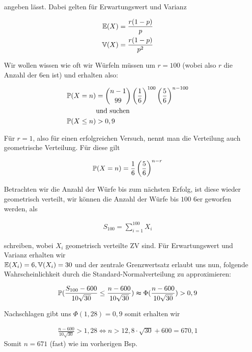 \begin{solution}
angeben lässt. Dabei gelten für Erwartungswert und Varianz

\begin{align}
  \E(X) &= \frac{r(1-p)}{p} \nonumber \\
  \V(X) &= \frac{r(1-p)}{p^2} 
\end{align}

Wir wollen wissen wie oft wir Würfeln müssen um $r=100$ (wobei also $r$ die
Anzahl der $6$en ist) und erhalten also:

\begin{align*}
  \P(X=n) &= \binom{n-1}{99}\pbraces{\frac{1}{6}}^{100}\pbraces{\frac{5}{6}}^{n-100} \\
  &\text{und suchen} \\
  \P(X \leq n) &> 0,9
\end{align*}

Für $r=1$, also für einen erfolgreichen Versuch, nennt man die Verteilung auch
geometrische Verteilung. Für diese gilt

\begin{align*}
  \P(X=n)=\frac{1}{6}\pbraces{\frac{5}{6}}^{n-r}
\end{align*}

Betrachten wir die Anzahl der Würfe bis zum nächsten Erfolg, ist diese wieder
geometrisch verteilt, wir können die Anzahl der Würfe bis $100$ $6$er geworfen
werden, als

\begin{align*}
  S_{100} = \sum_{i=1}^{100}X_i
\end{align*}

schreiben, wobei $X_i$ geometrisch verteilte ZV sind. Für Erwartungswert und
Varianz erhalten wir \\
$\E(X_i)=6, \V(X_i)=30$ und der zentrale Grenzwertsatz erlaubt uns nun, folgende
Wahrscheinlichkeit durch die Standard-Normalverteilung zu approximieren:

\begin{align*}
  \P(\frac{S_{100}-600}{10\sqrt{30}} \leq \frac{n-600}{10\sqrt{30}}) \thickapprox
  \Phi(\frac{n-600}{10\sqrt{30}}) > 0,9
\end{align*}

Nachschlagen gibt uns $\Phi(1,28)=0,9$ somit erhalten wir

\begin{align*}
  \frac{n-600}{10\sqrt{30}} > 1,28 \Leftrightarrow
  n > 12,8 \cdot \sqrt{30} + 600 = 670,1
\end{align*}
Somit $n=671$ (fast) wie im vorherigen Bsp.



\end{solution}

